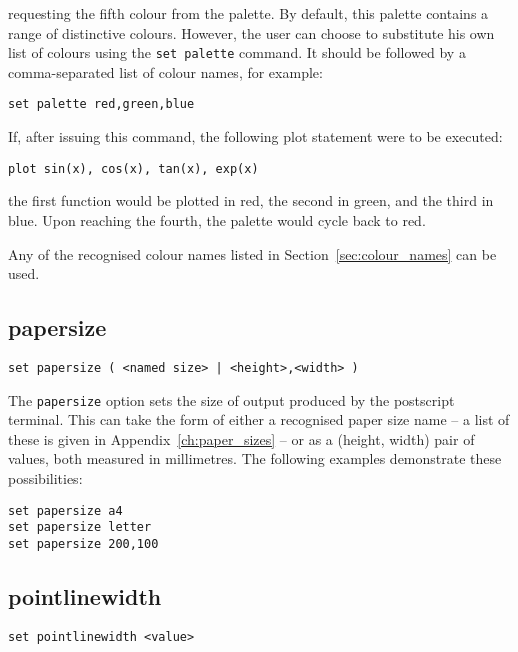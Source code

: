 \noindent requesting the fifth colour from the palette. By default, this palette
contains a range of distinctive colours. However, the user can choose to
substitute his own list of colours using the {\tt set palette} command. It
should be followed by a comma-separated list of colour names, for example:

\begin{verbatim}
set palette red,green,blue
\end{verbatim}

If, after issuing this command, the following plot statement were to be
executed:

\begin{verbatim}
plot sin(x), cos(x), tan(x), exp(x)
\end{verbatim}

\noindent the first function would be plotted in red, the second in green, and the third
in blue. Upon reaching the fourth, the palette would cycle back to red.

Any of the recognised colour names listed in Section~\ref{sec:colour_names} can be used.


\subsection{papersize}

\begin{verbatim}
set papersize ( <named size> | <height>,<width> )
\end{verbatim}

The {\tt papersize} option sets the size of output produced by the postscript
terminal. This can take the form of either a recognised paper size name -- a
list of these is given in Appendix~\ref{ch:paper_sizes} -- or as a (height,
width) pair of values, both measured in millimetres. The following examples
demonstrate these possibilities:

\begin{verbatim}
set papersize a4
set papersize letter
set papersize 200,100
\end{verbatim}


\subsection{pointlinewidth}

\begin{verbatim}
set pointlinewidth <value>
\end{verbatim}

